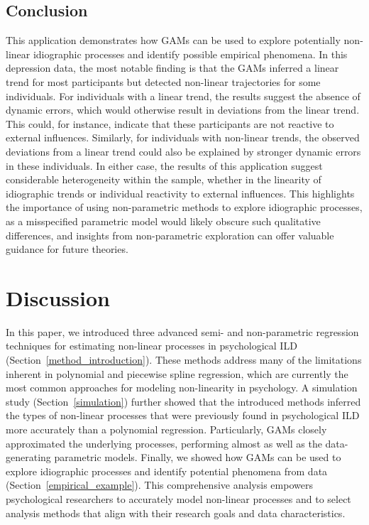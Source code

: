 \documentclass[man, floatsintext]{apa7}
\begin{document}
\subsection{Conclusion}

This application demonstrates how GAMs can be used to explore potentially
non-linear idiographic processes and identify possible empirical phenomena. In
this depression data, the most notable finding is that the GAMs inferred a
linear trend for most participants but detected non-linear trajectories for
some individuals. For individuals with a linear trend, the results suggest the
absence of dynamic errors, which would otherwise result in deviations from the
linear trend. This could, for instance, indicate that these participants are
not reactive to external influences. Similarly, for individuals with non-linear
trends, the observed deviations from a linear trend could also be explained by
stronger dynamic errors in these individuals. In either case, the results of
this application suggest considerable heterogeneity within the sample, whether
in the linearity of idiographic trends or individual reactivity to external
influences. This highlights the importance of using non-parametric methods to
explore idiographic processes, as a misspecified parametric model would likely
obscure such qualitative differences, and insights from non-parametric
exploration can offer valuable guidance for future theories.

\section{Discussion}

In this paper, we introduced three advanced semi- and non-parametric regression
techniques for estimating non-linear processes in psychological ILD
(Section~\ref{method_introduction}). These methods address many of the
limitations inherent in polynomial and piecewise spline regression, which are
currently the most common approaches for modeling non-linearity in psychology.
A simulation study (Section~\ref{simulation}) further showed that the
introduced methods inferred the types of non-linear processes that were
previously found in psychological ILD more accurately than a polynomial
regression. Particularly, GAMs closely approximated the underlying processes,
performing almost as well as the data-generating parametric models. Finally, we
showed how GAMs can be used to explore idiographic processes and identify
potential phenomena from data (Section~\ref{empirical_example}). This
comprehensive analysis empowers psychological researchers to accurately model
non-linear processes and to select analysis methods that align with their
research goals and data characteristics.
\end{document}
